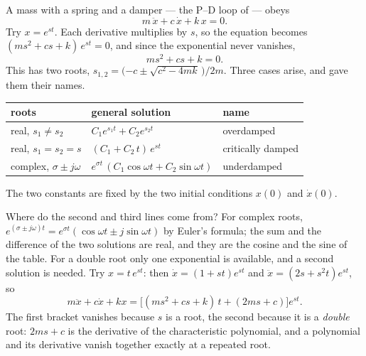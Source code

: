 A mass with a spring and a damper — the P–D loop of  — obeys
\begin{equation}\label{eq:A-second}
  m\,\ddot x + c\,\dot x + k\,x = 0 .
\end{equation}
Try $x = e^{st}$. Each derivative multiplies by $s$, so the equation becomes $(ms^2 + cs + k)\,e^{st} = 0$, and since the exponential never vanishes,
\begin{equation}
  m s^2 + c s + k = 0 .
\end{equation}
This  has two roots, $s_{1,2} = \big({-c} \pm \sqrt{c^2 - 4mk}\,\big)/2m$. Three cases arise, and  gave them their names.

\begin{result}
\begin{center}\small
\renewcommand{\arraystretch}{1.35}
\begin{tabular}{@{}lll@{}}
\toprule
roots & general solution & name\\
\midrule
real, $s_1 \ne s_2$ & $C_1 e^{s_1 t} + C_2 e^{s_2 t}$ & overdamped\\
real, $s_1 = s_2 = s$ & $(C_1 + C_2\,t)\,e^{st}$ & critically damped\\
complex, $\sigma \pm j\omega$ & $e^{\sigma t}\,(C_1\cos\omega t + C_2\sin\omega t)$ & underdamped\\
\bottomrule
\end{tabular}
\end{center}
The two constants are fixed by the two initial conditions $x(0)$ and $\dot x(0)$.
\end{result}

Where do the second and third lines come from? For complex roots, $e^{(\sigma \pm j\omega)t} = e^{\sigma t}(\cos\omega t \pm j\sin\omega t)$ by Euler's formula; the sum and the difference of the two solutions are real, and they are the cosine and the sine of the table. For a double root only one exponential is available, and a second solution is needed. Try $x = t\,e^{st}$: then $\dot x = (1 + st)e^{st}$ and $\ddot x = (2s + s^2t)e^{st}$, so
\begin{equation*}
  m\ddot x + c\dot x + kx = \big[(ms^2 + cs + k)\,t + (2ms + c)\big]e^{st} .
\end{equation*}
The first bracket vanishes because $s$ is a root, the second because it is a \emph{double} root: $2ms + c$ is the derivative of the characteristic polynomial, and a polynomial and its derivative vanish together exactly at a repeated root.

